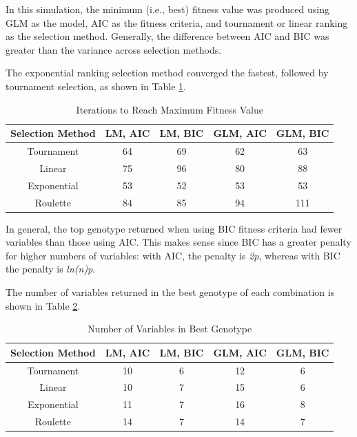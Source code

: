 \documentclass{article}
\begin{document}
\vspace{5cm}

In this simulation, the minimum (i.e., best) fitness value was produced using GLM as the model, AIC as the fitness criteria, and tournament or linear ranking as the selection method.  Generally, the difference between AIC and BIC was greater than the variance across selection methods.

The exponential ranking selection method converged the fastest, followed by tournament selection, as shown in Table \ref{table:8}.

\begin{table}[htp]
    \centering
    \caption{Iterations to Reach Maximum Fitness Value}

\begin{tabular}{ |c|c|c|c|c|  }
 \hline
 Selection Method & LM, AIC & LM, BIC & GLM, AIC & GLM, BIC\\
 \hline
 Tournament & 64  & 69 & 62  & 63\\
 Linear & 75 & 96  & 80 & 88\\
 Exponential & 53 & 52 & 53 & 53\\
 Roulette   & 84 & 85 & 94 & 111\\
 \hline
\end{tabular}

    \label{table:8}
\end{table}


In general, the top genotype returned when using BIC fitness criteria had fewer variables than those using AIC.  This makes sense since BIC has a greater penalty for higher numbers of variables:  with AIC, the penalty is \textit{2p}, whereas with BIC the penalty is \textit{ln(n)p}.


The number of variables returned in the best genotype of each combination is shown in Table \ref{table:9}.

\begin{table}[htp]
    \centering
    \caption{Number of Variables in Best Genotype}

    \begin{tabular}{ |c|c|c|c|c|  }
      \hline
      Selection Method & LM, AIC & LM, BIC & GLM, AIC & GLM, BIC\\
      \hline
      Tournament &  10   & 6 & 12  & 6\\
      Linear & 10 & 7  & 15 & 6\\
      Exponential & 11 & 7 & 16 & 8\\
      Roulette   & 14 & 7 & 14 & 7\\
    \hline
    \end{tabular}

    \label{table:9}
\end{table}
\end{document}
